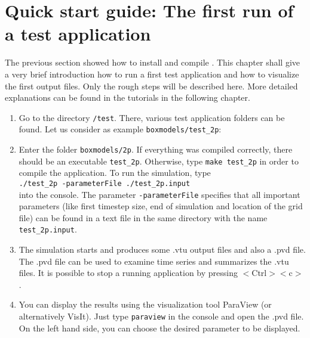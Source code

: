\section[Quick start guide]{Quick start guide: The first run of a test application}\label{quick-start-guide}

The previous section showed how to install and compile \Dumux. This chapter shall give a very brief introduction how to run a first test application and how to visualize the first output files. Only the rough steps will be described here. More detailed explanations can be found in the tutorials in the following chapter.

\begin{enumerate}
 \item Go to the directory \texttt{/test}. There, various test application folders can be found. Let us consider as example \texttt{boxmodels/test{\_}2p}:
 \item Enter the folder \texttt{boxmodels/2p}. If everything was compiled correctly, there should be an executable \texttt{test{\_}2p}. Otherwise, type \texttt{make test{\_}2p} in order to compile the application. To run the simulation, type\\ 
\texttt{./test{\_}2p -parameterFile ./test\_2p.input}\\
into the console. The parameter \texttt{-parameterFile} specifies that all important parameters (like first timestep size, end of simulation and location of the grid file) can be found in a text file in the same directory  with the name \texttt{test\_2p.input}. 
 \item The simulation starts and produces some .vtu output files and also a .pvd file. The .pvd file can be used to examine time series and summarizes the .vtu files. It is possible to stop a running application by pressing $<$Ctrl$><$c$>$.
 \item You can display the results using the visualization tool ParaView (or alternatively VisIt). Just type \texttt{paraview} in the console and open the .pvd file. On the left hand side, you can choose the desired parameter to be displayed.
\end{enumerate}
